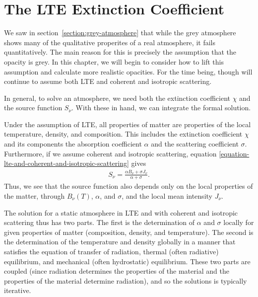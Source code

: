 
\newcommand{\crosssection}{a}

\chapter{The LTE Extinction Coefficient}
\label{chapter-lte-opacity-and-emissivity}

\noindent
We saw in section~\ref{section:grey-atmosphere} that while the grey atmosphere shows many of the qualitative properites of a real atmosphere, it fails quantitatively. The main reason for this is precisely the assumption that the opacity is grey. In this chapter, we will begin to consider how to lift this assumption and calculate more realistic opacities. For the time being, though will continue to assume both LTE and coherent and isotropic scattering.

\newslide

In general, to solve an atmosphere, we need both the extinction coefficient $\chi$ and the source function $S_\nu$. With these in hand, we can integrate the formal solution. 

Under the assumption of LTE, all properties of matter are properties of the local temperature, density, and composition. This includes the extinction coefficient $\chi$ and its components the absorption coefficient $\alpha$ and the scattering coefficient $\sigma$.
Furthermore, if we assume coherent and isotropic scattering, equation \ref{equation-lte-and-coherent-and-isotropic-scattering} gives
\begin{align}
S_\nu = \frac{\alpha B_\nu + \sigma J_\nu}{\alpha + \sigma}.
\end{align}
Thus, we see that the source function also depends only on the local properties of the matter, through $B_\nu(T)$, $\alpha$, and $\sigma$, and the local mean intensity $J_\nu$.

The solution for a static atmosphere in LTE and with coherent and isotropic scattering thus has two parts. The first is the determination of $\alpha$ and $\sigma$ locally for given properties of matter (composition, density, and temperature). The second is the determination of the temperature and density globally in a manner that satisfies the equation of transfer of radiation, thermal (often radiative) equilibrium, and mechanical (often hydrostatic) equilibrium. These two parts are coupled (since radiation determines the properties of the material and the properties of the material determine radiation), and so the solutions is typically iterative.

